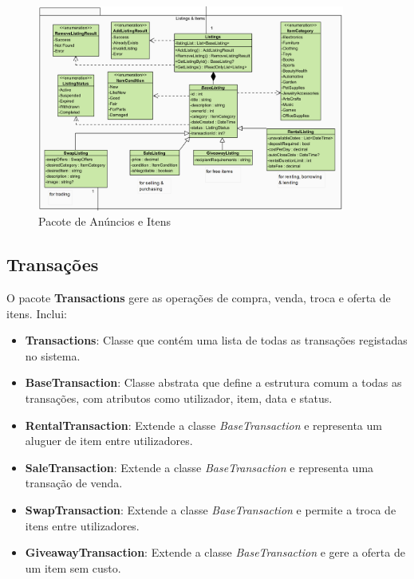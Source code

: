\documentclass[a4paper, 12pt]{article} %
\begin{document}
\begin{figure}[ht]
	\centering
	\includegraphics[width=0.9\textwidth]{diagrama_classes_anuncios_itens.png}
	\caption{Pacote de Anúncios e Itens}
	\label{fig:diagrama_classes_anuncios_itens}
\end{figure}

\subsection{Transações}

O pacote \textbf{Transactions} gere as operações de compra, venda, troca e oferta de itens. Inclui:

\begin{itemize}
	\item \textbf{Transactions}: Classe que contém uma lista de todas as transações registadas no sistema.
	\item \textbf{BaseTransaction}: Classe abstrata que define a estrutura comum a todas as transações, com atributos como utilizador, item, data e status.
	\item \textbf{RentalTransaction}: Extende a classe \textit{BaseTransaction} e representa um aluguer de item entre utilizadores.
	\item \textbf{SaleTransaction}: Extende a classe \textit{BaseTransaction} e representa uma transação de venda.
	\item \textbf{SwapTransaction}: Extende a classe \textit{BaseTransaction} e permite a troca de itens entre utilizadores.
	\item \textbf{GiveawayTransaction}: Extende a classe \textit{BaseTransaction} e gere a oferta de um item sem custo.
\end{itemize}
\end{document}
